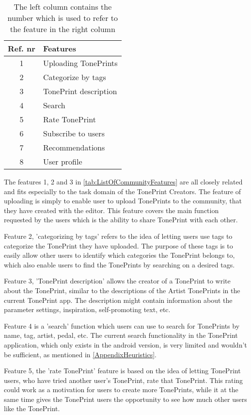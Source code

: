 \begin{table}[H]
	\centering
\begin{tabular}[width=\textwidth]{c|l}
\textbf{Ref. nr} & \textbf{Features} \\ \hline
1 & Uploading TonePrints \\ \hline
2 & Categorize by tags \\ \hline
3 & TonePrint description \\ \hline
4 & Search \\ \hline
5 & Rate TonePrint \\ \hline
6 & Subscribe to users \\ \hline
7 & Recommendations \\ \hline
8 & User profile \\ \hline
\end{tabular}
\caption{The left column contains the number which is used to refer to the feature in the right column}
\label{tab:ListOfCommunityFeatures}
\end{table}

The features 1, 2 and 3 in \autoref{tab:ListOfCommunityFeatures} are all closely related and fits especially to the task domain of the TonePrint Creators. The feature of uploading is simply to enable user to upload TonePrints to the community, that they have created with the editor. This feature covers the main function requested by the users which is the ability to share TonePrint with each other.

Feature 2, 'categorizing by tags' refers to the idea of letting users use tags to categorize the TonePrint they have uploaded. The purpose of these tags is to easily allow other users to identify which categories the TonePrint belongs to, which also enable users to find the TonePrints by searching on a desired tags.

Feature 3, 'TonePrint description' allows the creator of a TonePrint to write about the TonePrint, similar to the descriptions of the Artist TonePrints in the current TonePrint app. The description might contain information about the parameter settings, inspiration, self-promoting text, etc.

Feature 4 is a 'search' function which users can use to search for TonePrints by name, tag, artist, pedal, etc. The current search functionality in the TonePrint application, which only exists in the android version, is very limited and wouldn't be sufficient, as mentioned in \autoref{AppendixHeuristics}.

Feature 5, the 'rate TonePrint' feature is based on the idea of letting TonePrint users, who have tried another user's TonePrint, rate that TonePrint. This rating could work as a motivation for users to create more TonePrints, while it at the same time gives the TonePrint users the opportunity to see how much other users like the TonePrint.


